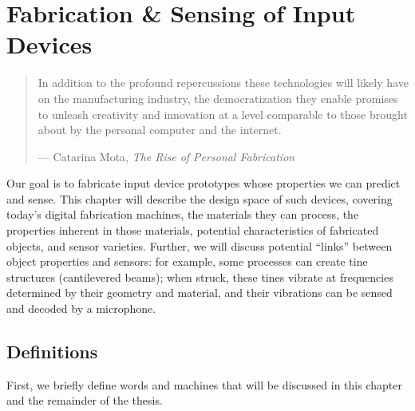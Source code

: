 \chapter{Fabrication \& Sensing of Input Devices}


\begin{quote}
In addition to the profound repercussions these technologies
will likely have on the manufacturing industry, the
democratization they enable promises to unleash creativity
and innovation at a level comparable to those brought about
by the personal computer and the internet.

--- Catarina Mota, \emph{The Rise of Personal Fabrication}
\end{quote}

Our goal is to fabricate input device prototypes whose properties we can predict and sense. This chapter will describe the design space of such devices, covering today's digital fabrication machines, the materials they can process, the properties inherent in those materials, potential characteristics of fabricated objects, and sensor varieties. Further, we will discuss potential ``links'' between object properties and sensors: for example, some processes can create tine structures (cantilevered beams); when struck, these tines vibrate at frequencies determined by their geometry and material, and their vibrations can be sensed and decoded by a microphone.

 

\section{Definitions}

First, we briefly define words and machines that will be discussed in this chapter and the remainder of the thesis.

